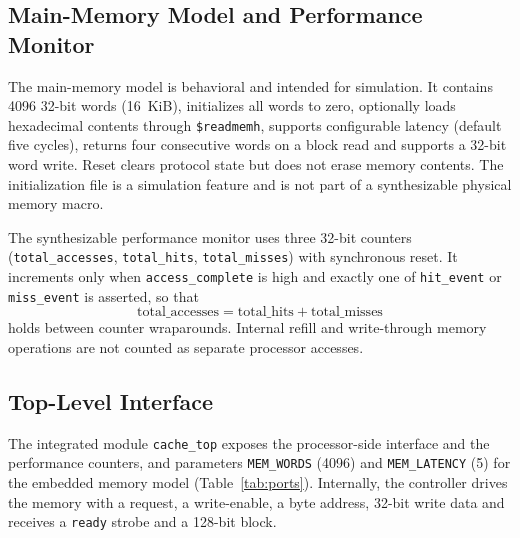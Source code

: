 \documentclass[conference,a4paper]{IEEEtran}
\begin{document}
\subsection{Main-Memory Model and Performance Monitor}\label{sec:memmon}
The main-memory model is behavioral and intended for simulation. It contains 4096 32-bit words (16~KiB), initializes all words to zero, optionally loads hexadecimal contents through \texttt{\$readmemh}, supports configurable latency (default five cycles), returns four consecutive words on a block read and supports a 32-bit word write. Reset clears protocol state but does not erase memory contents. The initialization file is a simulation feature and is not part of a synthesizable physical memory macro.

The synthesizable performance monitor uses three 32-bit counters (\texttt{total\_accesses}, \texttt{total\_hits}, \texttt{total\_misses}) with synchronous reset. It increments only when \texttt{access\_complete} is high and exactly one of \texttt{hit\_event} or \texttt{miss\_event} is asserted, so that
\begin{equation}
\mathrm{total\_accesses} = \mathrm{total\_hits} + \mathrm{total\_misses}
\label{eq:inv}
\end{equation}
holds between counter wraparounds. Internal refill and write-through memory operations are not counted as separate processor accesses.

\subsection{Top-Level Interface}\label{sec:iface}
The integrated module \texttt{cache\_top} exposes the processor-side interface and the performance counters, and parameters \texttt{MEM\_WORDS} (4096) and \texttt{MEM\_LATENCY} (5) for the embedded memory model (Table~\ref{tab:ports}). Internally, the controller drives the memory with a request, a write-enable, a byte address, 32-bit write data and receives a \texttt{ready} strobe and a 128-bit block.
\end{document}
